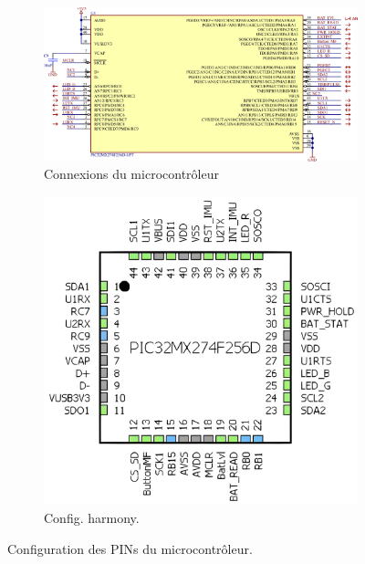 \begin{figure}[h]
	\centering
	\begin{subfigure}[b]{0.7\textwidth}
		\centering
		\includegraphics[width=1\linewidth]{../figures/etude/sch/MCU}
		\caption{Connexions du microcontrôleur}
		\label{fig:mcu}
	\end{subfigure}
	\hfill
	\begin{subfigure}[b]{0.25\textwidth}
		\centering
		\includegraphics[width=1\linewidth]{../figures/etude/sch/MCU-HARMONY}
		\caption{Config. \gls{harmony}.}
		\label{fig:mcu-harmony}
	\end{subfigure}
	\hfill
	\caption{Configuration des PINs du microcontrôleur.}
	\label{fig:sch-connMcu}
\end{figure}

